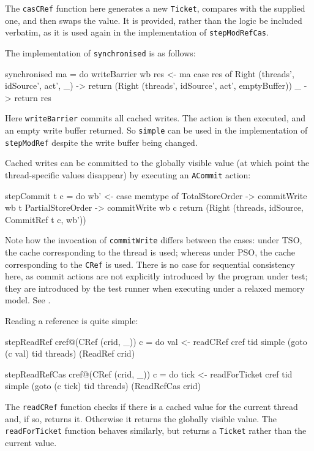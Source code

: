 The \verb|casCRef| function here generates a new \verb|Ticket|,
compares with the supplied one, and then swaps the value. It is
provided, rather than the logic be included verbatim, as it is used
again in the implementation of \verb|stepModRefCas|.

The implementation of \verb|synchronised| is as follows:

\begin{haskellcode}
synchronised ma = do
  writeBarrier wb
  res <- ma
  case res of
    Right (threads', idSource', act', _) -> return
      (Right (threads', idSource', act', emptyBuffer))
    _ -> return res
\end{haskellcode}

Here \verb|writeBarrier| commits all cached writes. The action is then
executed, and an empty write buffer returned. So \verb|simple| can be
used in the implementation of \verb|stepModRef| despite the write
buffer being changed.

Cached writes can be committed to the globally visible value (at which
point the thread-specific values disappear) by executing an
\verb|ACommit| action:

\begin{haskellcode}
stepCommit t c = do
  wb' <- case memtype of
    TotalStoreOrder   -> commitWrite wb t
    PartialStoreOrder -> commitWrite wb c
  return (Right (threads, idSource, CommitRef t c, wb'))
\end{haskellcode}

Note how the invocation of \verb|commitWrite| differs between the
cases: under TSO, the cache corresponding to the thread is used;
whereas under PSO, the cache corresponding to the \verb|CRef| is
used. There is no case for sequential consistency here, as commit
actions are not explicitly introduced by the program under test; they
are introduced by the test runner when executing under a relaxed
memory model. See .

Reading a reference is quite simple:

\begin{haskellcode}
stepReadRef cref@(CRef (crid, _)) c = do
  val <- readCRef cref tid
  simple (goto (c val) tid threads) (ReadRef crid)

stepReadRefCas cref@(CRef (crid, _)) c = do
  tick <- readForTicket cref tid
  simple (goto (c tick) tid threads) (ReadRefCas crid)
\end{haskellcode}

The \verb|readCRef| function checks if there is a cached value for the
current thread and, if so, returns it. Otherwise it returns the
globally visible value. The \verb|readForTicket| function behaves
similarly, but returns a \verb|Ticket| rather than the current value.

